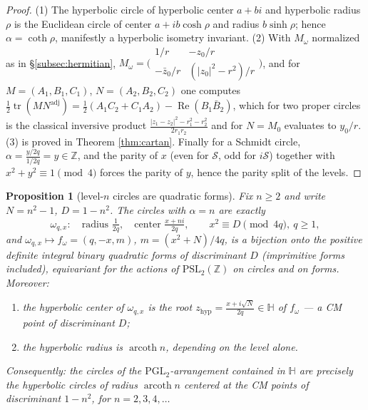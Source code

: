 \documentclass[11pt]{amsart}
\numberwithin{equation}{section}
\theoremstyle{plain}
\newtheorem{proposition}[theorem]{Proposition}
\theoremstyle{definition}
\theoremstyle{remark}
\newcommand{\Z}{\mathbb{Z}}
\newcommand{\HH}{\mathbb{H}}
\newcommand{\PSL}{\mathrm{PSL}}
\newcommand{\PGL}{\mathrm{PGL}}
\newcommand{\tr}{\operatorname{tr}}
\newcommand{\re}{\operatorname{Re}}
\newcommand{\arcoth}{\operatorname{arcoth}}
\newcommand{\Sarr}{\mathcal{S}}
\begin{document}
\begin{proof}
(1) The hyperbolic circle of hyperbolic center $a + bi$ and hyperbolic
radius $\rho$ is the Euclidean circle of center $a + ib\cosh\rho$ and
radius $b\sinh\rho$; hence $\alpha = \coth\rho$, manifestly a hyperbolic
isometry invariant.  (2) With $M_\omega$ normalized as in
\S\ref{subsec:hermitian}, $M_\omega = \bigl(\begin{smallmatrix} 1/r &
-z_0/r \\ -\bar z_0/r & (|z_0|^2 - r^2)/r \end{smallmatrix}\bigr)$, and
for $M = (A_1, B_1, C_1)$, $N = (A_2, B_2, C_2)$ one computes
$\tfrac12\tr(MN^{\mathrm{adj}}) = \tfrac12(A_1C_2 + C_1A_2) -
\re(B_1\bar B_2)$, which for two proper circles is the classical
inversive product $\frac{|z_1 - z_2|^2 - r_1^2 - r_2^2}{2r_1r_2}$ and
for $N = M_0$ evaluates to $y_0/r$.  (3) is proved in
Theorem \ref{thm:cartan}.  Finally for a Schmidt circle,
$\alpha = \frac{y/2q}{1/2q} = y \in \Z$, and the parity of $x$ (even for
$\Sarr$, odd for $i\Sarr$) together with $x^2 + y^2 \equiv 1 \pmod 4$
forces the parity of $y$, hence the parity split of the levels.
\end{proof}

\begin{proposition}[level-$n$ circles are quadratic forms]
\label{prop:formdictionary}
Fix $n \ge 2$ and write $N = n^2 - 1$, $D = 1 - n^2$.  The circles with
$\alpha = n$ are exactly
\[
  \omega_{q,x}: \quad \text{radius } \tfrac{1}{2q}, \quad
  \text{center } \tfrac{x + ni}{2q},
  \qquad x^2 \equiv D \pmod{4q},\ q \ge 1,
\]
and $\omega_{q,x} \mapsto f_\omega = (q, -x, m)$, $m = (x^2 + N)/4q$, is
a bijection onto the positive definite integral binary quadratic forms of
discriminant $D$ (imprimitive forms included), equivariant for the
actions of $\PSL_2(\Z)$ on circles and on forms.  Moreover:
\begin{enumerate}
\item the hyperbolic center of $\omega_{q,x}$ is the root
$z_{\mathrm{hyp}} = \frac{x + i\sqrt N}{2q} \in \HH$ of $f_\omega$ --- a
CM point of discriminant $D$;
\item the hyperbolic radius is $\arcoth n$, depending on the level
alone.
\end{enumerate}
Consequently: \emph{the circles of the $\PGL_2$-arrangement contained in
$\HH$ are precisely the hyperbolic circles of radius $\arcoth n$ centered
at the CM points of discriminant $1 - n^2$, for $n = 2, 3, 4, \dots$}
\end{proposition}
\end{document}
